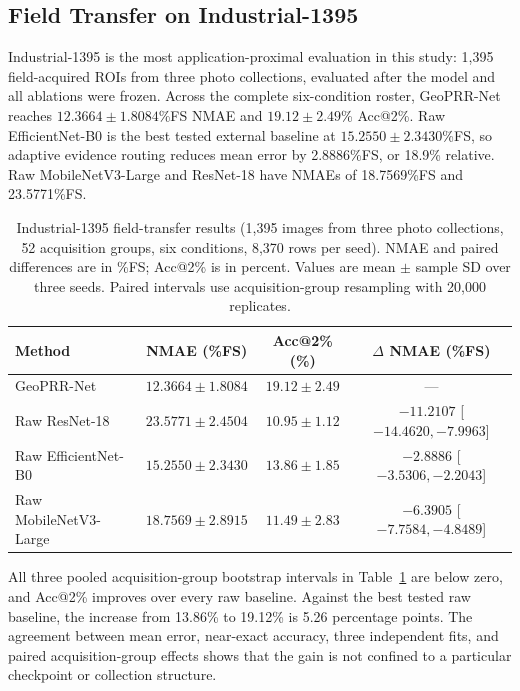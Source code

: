 \documentclass[electronics,article,submit,oneauthor]{Definitions/mdpi}
\newcommand{\modelname}{GeoPRR-Net\xspace}
\begin{document}
\subsection{Field Transfer on Industrial-1395}
\label{subsec:industrial_results}

Industrial-1395 is the most application-proximal evaluation in this study: 1,395 field-acquired ROIs from three photo collections, evaluated after the model and all ablations were frozen. Across the complete six-condition roster, \modelname reaches $12.3664\pm1.8084$\%FS NMAE and $19.12\pm2.49$\% Acc@2\%. Raw EfficientNet-B0 is the best tested external baseline at $15.2550\pm2.3430$\%FS, so adaptive evidence routing reduces mean error by 2.8886\%FS, or 18.9\% relative. Raw MobileNetV3-Large and ResNet-18 have NMAEs of 18.7569\%FS and 23.5771\%FS.

\begin{table}[H]
\caption{Industrial-1395 field-transfer results (1,395 images from three photo collections, 52 acquisition groups, six conditions, 8,370 rows per seed). NMAE and paired differences are in \%FS; Acc@2\% is in percent. Values are mean $\pm$ sample SD over three seeds. Paired intervals use acquisition-group resampling with 20,000 replicates.}
\label{tab:industrial}
\centering
\small
\begin{tabularx}{\textwidth}{@{}>{\raggedright\arraybackslash}Xccc@{}}
\toprule
\textbf{Method} & \textbf{NMAE (\%FS)} & \textbf{Acc@2\% (\%)} & \textbf{$\Delta$ NMAE (\%FS)} \\
\midrule
\modelname & $12.3664\pm1.8084$ & $19.12\pm2.49$ & --- \\
Raw ResNet-18 & $23.5771\pm2.4504$ & $10.95\pm1.12$ & $-11.2107$ [$-14.4620,-7.9963$] \\
Raw EfficientNet-B0 & $15.2550\pm2.3430$ & $13.86\pm1.85$ & $-2.8886$ [$-3.5306,-2.2043$] \\
Raw MobileNetV3-Large & $18.7569\pm2.8915$ & $11.49\pm2.83$ & $-6.3905$ [$-7.7584,-4.8489$] \\
\bottomrule
\end{tabularx}
\end{table}

All three pooled acquisition-group bootstrap intervals in Table~\ref{tab:industrial} are below zero, and Acc@2\% improves over every raw baseline. Against the best tested raw baseline, the increase from 13.86\% to 19.12\% is 5.26 percentage points. The agreement between mean error, near-exact accuracy, three independent fits, and paired acquisition-group effects shows that the gain is not confined to a particular checkpoint or collection structure.
\end{document}
